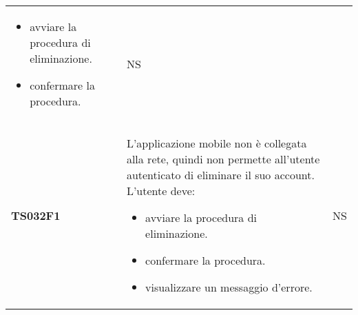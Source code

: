 \documentclass[../piano-di-qualifica.tex]{subfiles}
\begin{document}
\begin{centering}
\begin{longtable}[H]{>{\centering\bfseries}m{3cm} >{}p{10cm} >{\centering\arraybackslash}m{3cm}}
\begin{itemize}
                        \item avviare la procedura di eliminazione.
                        \item confermare la procedura.
                      \end{itemize}
                    & NS \\
        TS032F1     & L'applicazione mobile non è collegata alla rete, quindi non permette all'utente autenticato di eliminare il suo account. \newline
                      L'utente deve:
                      \begin{itemize}
                        \item avviare la procedura di eliminazione.
                        \item confermare la procedura.
                        \item visualizzare un messaggio d'errore.
                      \end{itemize}
                    & NS \\



\end{longtable}
\end{centering}
\end{document}
